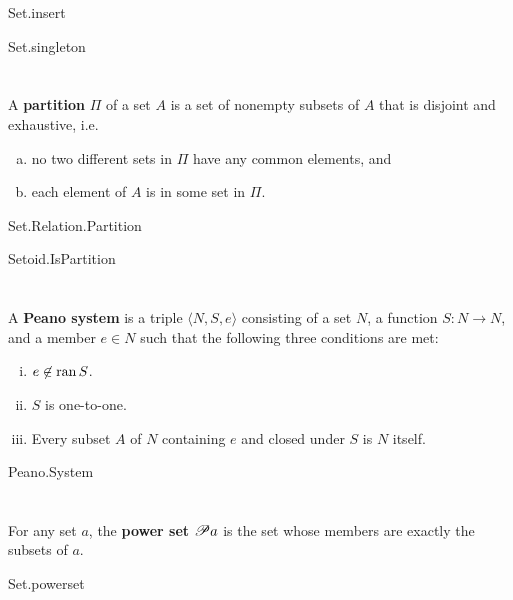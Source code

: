 \documentclass{report}
\begin{document}
    {Set.insert}

    {Set.singleton}

\section{}%

  A \textbf{partition} $\Pi$ of a set $A$ is a set of nonempty subsets of $A$
    that is disjoint and exhaustive, i.e.
    \begin{enumerate}[(a)]
      \item no two different sets in $\Pi$ have any common elements, and
      \item each element of $A$ is in some set in $\Pi$.
    \end{enumerate}

    {Set.Relation.Partition}

    {Setoid.IsPartition}

\section{}%

  A \textbf{Peano system} is a triple $\langle N, S, e \rangle$ consisting of a
    set $N$, a function $S \colon N \rightarrow N$, and a member $e \in N$ such
    that the following three conditions are met:
  \begin{enumerate}[(i)]
    \item $e \not\in \mathop{\text{ran}}{S}$.
    \item $S$ is one-to-one.
    \item Every subset $A$ of $N$ containing $e$ and closed under $S$ is $N$
      itself.
  \end{enumerate}

    {Peano.System}

\section{}%

  For any set $a$, the \textbf{power set $\mathscr{P}a$} is the set whose
    members are exactly the subsets of $a$.

    {Set.powerset}
\end{document}
